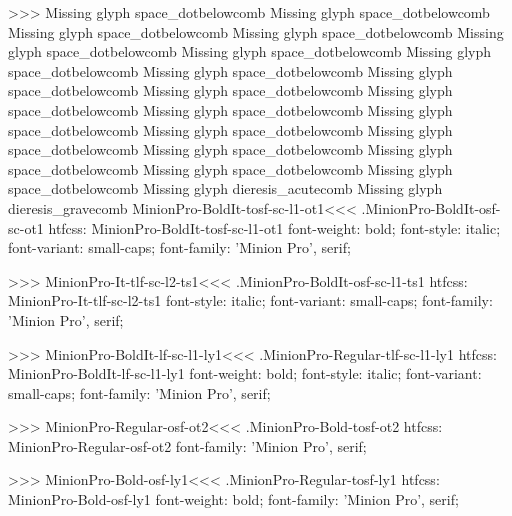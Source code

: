 {>>>
Missing glyph	space_dotbelowcomb
Missing glyph	space_dotbelowcomb
Missing glyph	space_dotbelowcomb
Missing glyph	space_dotbelowcomb
Missing glyph	space_dotbelowcomb
Missing glyph	space_dotbelowcomb
Missing glyph	space_dotbelowcomb
Missing glyph	space_dotbelowcomb
Missing glyph	space_dotbelowcomb
Missing glyph	space_dotbelowcomb
Missing glyph	space_dotbelowcomb
Missing glyph	space_dotbelowcomb
Missing glyph	space_dotbelowcomb
Missing glyph	space_dotbelowcomb
Missing glyph	space_dotbelowcomb
Missing glyph	space_dotbelowcomb
Missing glyph	space_dotbelowcomb
Missing glyph	space_dotbelowcomb
Missing glyph	space_dotbelowcomb
Missing glyph	dieresis_acutecomb
Missing glyph	dieresis_gravecomb
\<MinionPro-BoldIt-tosf-sc-l1-ot1\><<<
.MinionPro-BoldIt-osf-sc-ot1
htfcss:  MinionPro-BoldIt-tosf-sc-l1-ot1  font-weight: bold; font-style: italic; font-variant: small-caps; font-family: 'Minion Pro', serif;

>>>
\<MinionPro-It-tlf-sc-l2-ts1\><<<
.MinionPro-BoldIt-osf-sc-l1-ts1
htfcss:  MinionPro-It-tlf-sc-l2-ts1  font-style: italic; font-variant: small-caps; font-family: 'Minion Pro', serif;

>>>
\<MinionPro-BoldIt-lf-sc-l1-ly1\><<<
.MinionPro-Regular-tlf-sc-l1-ly1
htfcss:  MinionPro-BoldIt-lf-sc-l1-ly1  font-weight: bold; font-style: italic; font-variant: small-caps; font-family: 'Minion Pro', serif;

>>>
\<MinionPro-Regular-osf-ot2\><<<
.MinionPro-Bold-tosf-ot2
htfcss:  MinionPro-Regular-osf-ot2  font-family: 'Minion Pro', serif;

>>>
\<MinionPro-Bold-osf-ly1\><<<
.MinionPro-Regular-tosf-ly1
htfcss:  MinionPro-Bold-osf-ly1  font-weight: bold; font-family: 'Minion Pro', serif;

}
